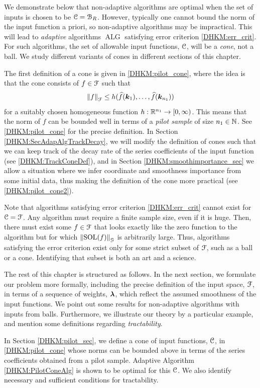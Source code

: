 \documentclass[USenglish]{article}
\theoremstyle{dgthm}
\theoremstyle{dgthm}
\theoremstyle{dgthm}
\theoremstyle{dgthm}
\theoremstyle{dgdef}
\theoremstyle{definition}
\DeclareMathOperator{\DHKMSOL}{SOL}
\DeclareMathOperator{\DHKMALG}{ALG}
\newcommand{\hf}{\widehat{f}}
\newcommand{\norm}[2][{}]{\ensuremath{\left \lVert #2 \right \rVert}_{#1}}
\begin{document}
We demonstrate below that non-adaptive algorithms are optimal when the set of inputs is chosen to be ${\mathcal{C}} = {\mathcal{B}}_R$. However, typically one cannot bound the norm of the input function a priori, so non-adaptive algorithms may be impractical. 
This will lead to \emph{adaptive} algorithms $\DHKMALG$ satisfying error criterion \eqref{DHKM:err_crit}.  For such algorithms, the set of allowable input functions, ${\mathcal{C}}$, will be a \emph{cone}, not a ball. We study different variants of cones in different sections of this chapter. 

The first definition of a cone is given in \eqref{DHKM:pilot_cone}, 
where the idea is that the cone consists of $f\in{\mathcal{F}}$ such that 
$$
  \norm[\calF]{f}\le h (\hf(\bsk_1),\ldots,\hf (\bsk_{n_1}))
$$
for a suitably chosen homogeneous function $h:{\mathbb{R}}^{n_1}\rightarrow [0,\infty)$. This means that the norm of $f$ can be bounded well in terms of 
a \emph{pilot sample} of size $n_1\in{\mathbb{N}}$. See \eqref{DHKM:pilot_cone} for the precise definition. In Section \ref{DHKM:SecAdapAlgTrackDecay}, we will modify the definition of cones such that we can keep track of the decay rate of the series coefficients of the input function (see \eqref{DHKM:TrackConeDef}), 
and in Section \ref{DHKM:smoothimportance_sec} we allow a situation 
where we infer coordinate and smoothness importance from some initial data, thus making the definition of the cone more practical (see  
\eqref{DHKM:pilot_cone2}).

Note that algorithms satisfying error criterion \eqref{DHKM:err_crit} cannot exist for ${\mathcal{C}} = {\mathcal{F}}$. Any algorithm must require a finite sample size, even if it is huge.  Then, there must exist some $f \in {\mathcal{F}}$ that looks exactly like the zero function to the algorithm but for which $\norm[\calG]{\DHKMSOL(f)}$ is arbitrarily large.  Thus, algorithms satisfying the error criterion  exist only for some strict subset of ${\mathcal{F}}$, such as a ball or a cone.  Identifying that subset is both an art and a science.

The rest of this chapter is structured as follows. In the next section, we formulate our problem more formally, including the precise definition of the input space, ${\mathcal{F}}$, in terms of a sequence of weights, ${\boldsymbol{\lambda}}$, which reflect the assumed smoothness of the input functions.  We point out some results for non-adaptive algorithms with inputs from balls. Furthermore, we illustrate our theory by 
a particular example, and mention some definitions regarding \emph{tractability}. 

In Section \ref{DHKM:pilot_sec}, we define a cone of input functions, ${\mathcal{C}}$, in \eqref{DHKM:pilot_cone} whose norms can be bounded above in terms of the series coefficients obtained from a pilot sample.  Adaptive Algorithm \ref{DHKM:PilotConeAlg} is shown to be optimal for this ${\mathcal{C}}$.  We also identify necessary and sufficient conditions for tractability.
\end{document}
